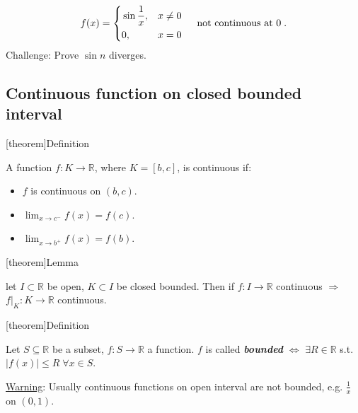 \documentclass[12pt]{report}
\theoremstyle{definition}
\begin{document}
\begin{ex}
    \[
        f(x) = \left\{
            \begin{align*}
                & \sin{\frac{1}{x}}, & x \neq 0 \\
                & 0, & x = 0
            \end{align*}
            \right.\quad\;\textnormal{not continuous at 0}\;.
    \]
    Challenge: Prove $\sin{n}$ diverges.
\end{ex}

\subsection{Continuous function on closed bounded interval}

[theorem]{Definition}
\begin{continuous for closed function}
    A function $f:K\rightarrow{}\mathbb{R}$, where $K = [b,c]$, is continuous if:
    \begin{itemize}
        \item $f$ is continuous on $(b,c)$.
        \item $\lim_{x\rightarrow{}c^{-}}f(x) = f(c)$.
        \item $\lim_{x\rightarrow{}b^{+}}f(x) = f(b)$.
    \end{itemize}
\end{continuous for closed function}

[theorem]{Lemma}
\begin{closed bound in open interval is continuous}
    let $I \subset \mathbb{R}$ be open, $K \subset I$ be closed bounded.
    Then if $f:I\rightarrow{}\mathbb{R}$ continuous $\Rightarrow{}$
    $f|_K:K\rightarrow{}\mathbb{R}$ continuous.
\end{closed bound in open interval is continuous}

[theorem]{Definition}
\begin{bounded function}
    Let $S \subseteq \mathbb{R}$ be a subset, $f:S\rightarrow{}\mathbb{R}$ a function.
    $f$ is called \textbf{\emph{bounded}} $\iff$
    $\exists R\in\mathbb{R}$ s.t. $|f(x)|\le R \;\forall x \in S$.
\end{bounded function}

\underline{Warning}: Usually continuous functions on open interval are not bounded,
e.g. $\frac{1}{x}$ on $(0,1)$.
\end{document}
